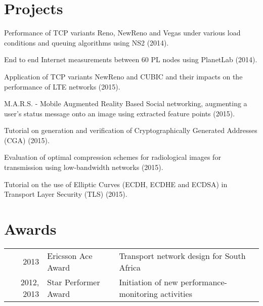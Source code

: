 \documentclass[]{deedy-resume-openfont}
\begin{document}
\begin{minipage}[t]{0.66\textwidth}

\section{Projects}
\item Performance of TCP variants Reno, NewReno and Vegas under various load conditions and queuing algorithms using NS2 (2014). 
\item End to end Internet measurements between 60 PL nodes using PlanetLab (2014). \\
\item Application of TCP variants NewReno and CUBIC and their impacts on the performance of LTE networks (2015).  \\
\item M.A.R.S. - Mobile Augmented Reality Based Social networking, augmenting a user's status message onto an image using extracted feature points (2015).
\item Tutorial on generation and verification of Cryptographically Generated Addresses (CGA) (2015).
\item Evaluation of optimal compression schemes for radiological images for transmission using low-bandwidth networks (2015). 
\item Tutorial on the use of Elliptic Curves (ECDH, ECDHE and ECDSA) in Transport Layer Security (TLS) (2015). 
\sectionsep


\section{Awards} 
\begin{center}
  \begin{tabular}{rll}
    2013	     & Ericsson Ace Award  & Transport network design for South Africa\\
    2012, 2013	     & Star Performer Award  & Initiation of new performance-monitoring activities \\
\end{tabular} 
\end{center}
\sectionsep

\end{minipage} 
\end{document}
